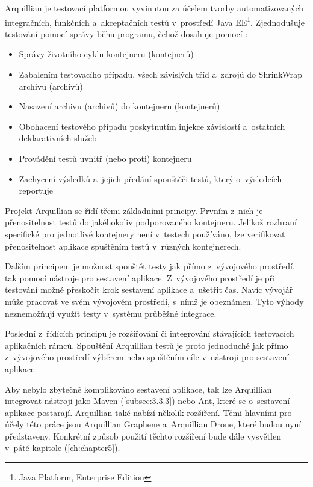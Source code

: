 \documentclass[
    color,   %
	table,   %
    twoside, %
    nolot, nolof,
]{fithesis3}
\begin{document}
Arquillian je testovací platformou vyvinutou za účelem tvorby automatizovaných integračních, funkčních a~akceptačních testů v~prostředí Java EE\footnote{Java Platform, Enterprise Edition}. Zjednodušuje testování pomocí správy běhu programu, čehož dosahuje pomocí \cite{Arquillian}:
\begin{itemize}
\item Správy životního cyklu kontejneru (kontejnerů)
\item Zabalením testovacího případu, všech závislých tříd a~zdrojů do ShrinkWrap \cite{ShrinkWrap} archivu (archivů)
\item Nasazení archivu (archivů) do kontejneru (kontejnerů)
\item Obohacení testového případu poskytnutím injekce závislostí a~ostatních deklarativních služeb
\item Provádění testů uvnitř (nebo proti) kontejneru
\item Zachycení výsledků a~jejich předání spouštěči testů, který o~výsledcích reportuje
\end{itemize}

Projekt Arquillian se řídí třemi základními principy. Prvním z~nich je přenositelnost testů do jakéhokoliv podporovaného kontejneru. Jelikož rozhraní specifické pro jednotlivé kontejnery není v~testech používáno, lze verifikovat přenositelnost aplikace spuštěním testů v~různých kontejnerech.

Dalším principem je možnost spouštět testy jak přímo z~vývojového prostředí, tak pomocí nástroje pro sestavení aplikace. Z~vývojového prostředí je při testování možné přeskočit krok sestavení aplikace a~ušetřit čas. Navíc vývojář může pracovat ve svém vývojovém prostředí, s~nímž je obeznámen. Tyto výhody neznemožňují využít testy v~systému průběžné integrace.

Poslední z~řídících principů je rozšiřování či integrování stávajících testovacích aplikačních rámců. Spouštění Arquillian testů je proto jednoduché jak přímo z~vývojového prostředí výběrem \emph{} nebo spuštěním cíle \emph{} v~nástroji pro sestavení aplikace.

Aby nebylo zbytečně komplikováno sestavení aplikace, tak lze Arquillian integrovat nástroji jako Maven (\ref{subsec:3.3.3}) nebo Ant, které se o~sestavení aplikace postarají. Arquillian také nabízí několik rozšíření. Těmi hlavními pro účely této práce jsou Arquillian Graphene a~Arquillian Drone, které budou nyní představeny. Konkrétní způsob použití těchto rozšíření bude dále vysvětlen v~páté kapitole (\ref{ch:chapter5}).
\end{document}
